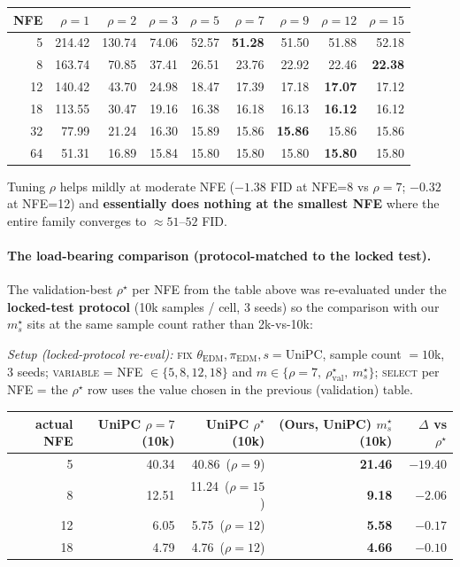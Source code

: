 \documentclass[11pt]{article}
\begin{document}
\begin{center}
\scriptsize
\begin{tabular}{r r r r r r r r r}
\toprule
NFE & \(\rho{=}1\) & \(\rho{=}2\) & \(\rho{=}3\) & \(\rho{=}5\) & \(\rho{=}7\) & \(\rho{=}9\) & \(\rho{=}12\) & \(\rho{=}15\) \\
\midrule
 5 & 214.42 & 130.74 & 74.06 & 52.57 & \textbf{51.28} & 51.50 & 51.88 & 52.18 \\
 8 & 163.74 &  70.85 & 37.41 & 26.51 & 23.76 & 22.92 & 22.46 & \textbf{22.38} \\
12 & 140.42 &  43.70 & 24.98 & 18.47 & 17.39 & 17.18 & \textbf{17.07} & 17.12 \\
18 & 113.55 &  30.47 & 19.16 & 16.38 & 16.18 & 16.13 & \textbf{16.12} & 16.12 \\
32 &  77.99 &  21.24 & 16.30 & 15.89 & 15.86 & \textbf{15.86} & 15.86 & 15.86 \\
64 &  51.31 &  16.89 & 15.84 & 15.80 & 15.80 & 15.80 & \textbf{15.80} & 15.80 \\
\bottomrule
\end{tabular}
\end{center}

Tuning \(\rho\) helps mildly at moderate NFE (\(-1.38\) FID at NFE=8 vs
\(\rho{=}7\); \(-0.32\) at NFE=12) and \textbf{essentially does nothing
at the smallest NFE} where the entire family converges to \(\approx 51
\text{--}52\) FID.

\paragraph{The load-bearing comparison (protocol-matched to the locked
test).} The validation-best \(\rho^\star\) per NFE from the table above
was re-evaluated under the \textbf{locked-test protocol} (10k samples /
cell, 3 seeds) so the comparison with our \(m_s^\star\) sits at the same
sample count rather than 2k-vs-10k:

\noindent\textit{Setup (locked-protocol re-eval):} \textsc{fix}
\(\theta_{\mathrm{EDM}}, \pi_{\mathrm{EDM}}, s = \mathrm{UniPC}\),
sample count \(=10\)k, 3 seeds; \textsc{variable} = NFE \(\in \{5,8,12,18\}\)
and \(m \in \{\rho{=}7,\ \rho^\star_{\mathrm{val}},\ m_s^\star\}\);
\textsc{select} per NFE = the \(\rho^\star\) row uses the value chosen
in the previous (validation) table.

\begin{center}
\small
\begin{tabular}{r r r r r}
\toprule
actual NFE & UniPC \(\rho{=}7\) (10k) & UniPC \(\rho^\star\) (10k) & \textbf{(Ours, UniPC) \(m_s^\star\)} (10k) & \(\Delta\) vs \(\rho^\star\) \\
\midrule
 5 & 40.34 & 40.86 \,(\(\rho{=}9\))  & \textbf{21.46} & \(\mathbf{-19.40}\) \\
 8 & 12.51 & 11.24 \,(\(\rho{=}15\)) & \textbf{9.18}  & \(\mathbf{-2.06}\) \\
12 &  6.05 &  5.75 \,(\(\rho{=}12\)) & \textbf{5.58}  & \(-0.17\) \\
18 &  4.79 &  4.76 \,(\(\rho{=}12\)) & \textbf{4.66}  & \(-0.10\) \\
\bottomrule
\end{tabular}
\end{center}
\end{document}
